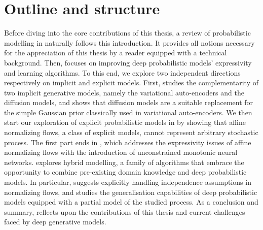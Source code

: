 \section{Outline and structure}

Before diving into the core contributions of this thesis, a review of probabilistic modelling in  naturally follows this introduction. It provides all notions necessary for the appreciation of this thesis by a reader equipped with a technical background. Then,  focuses on improving deep probabilistic models' expressivity and learning algorithms. To this end, we explore two independent directions respectively on implicit and explicit models. First,  studies the complementarity of two implicit generative models, namely the variational auto-encoders and the diffusion models, and shows that diffusion models are a suitable replacement for the simple Gaussian prior classically used in variational auto-encoders. We then start our exploration of explicit probabilistic models in  by showing that affine normalizing flows, a class of explicit models, cannot represent arbitrary stochastic process. The first part ends in , which addresses the expressivity issues of affine normalizing flows with the introduction of unconstrained monotonic neural networks.  explores hybrid modelling, a family of algorithms that embrace the opportunity to combine pre-existing domain knowledge and deep probabilistic models. In particular,  suggests explicitly handling independence assumptions in normalizing flows, and  studies the generalisation capabilities of deep probabilistic models equipped with a partial model of the studied process. As a conclusion and summary,  reflects upon the contributions of this thesis and current challenges faced by deep generative models.




